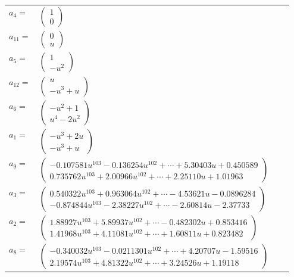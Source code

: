 \documentclass[1p]{elsarticle_modified}
\theoremstyle{definition}
\begin{document}
\begin{tabular}{m{7pt} m{180pt} m{7pt} m{180pt} }
\flushright $a_{4}=$&$\begin{pmatrix}1\\0\end{pmatrix}$ \\
\flushright $a_{11}=$&$\begin{pmatrix}0\\u\end{pmatrix}$ \\
\flushright $a_{5}=$&$\begin{pmatrix}1\\- u^2\end{pmatrix}$ \\
\flushright $a_{12}=$&$\begin{pmatrix}u\\- u^3+u\end{pmatrix}$ \\
\flushright $a_{6}=$&$\begin{pmatrix}- u^2+1\\u^4-2 u^2\end{pmatrix}$ \\
\flushright $a_{1}=$&$\begin{pmatrix}- u^3+2 u\\- u^3+u\end{pmatrix}$ \\
\flushright $a_{9}=$&$\begin{pmatrix}-0.107581 u^{103}-0.136254 u^{102}+\cdots+5.30403 u+0.450589\\0.735762 u^{103}+2.00966 u^{102}+\cdots+2.25110 u+1.01963\end{pmatrix}$ \\
\flushright $a_{3}=$&$\begin{pmatrix}0.540322 u^{103}+0.963064 u^{102}+\cdots-4.53621 u-0.0896284\\-0.874844 u^{103}-2.38227 u^{102}+\cdots-2.60814 u-2.37733\end{pmatrix}$ \\
\flushright $a_{2}=$&$\begin{pmatrix}1.88927 u^{103}+5.89937 u^{102}+\cdots-0.482302 u+0.853416\\1.41968 u^{103}+4.11081 u^{102}+\cdots+1.60811 u+0.823482\end{pmatrix}$ \\
\flushright $a_{8}=$&$\begin{pmatrix}-0.340032 u^{103}-0.0211301 u^{102}+\cdots+4.20707 u-1.59516\\2.19574 u^{103}+4.81322 u^{102}+\cdots+3.24526 u+1.19118\end{pmatrix}$ \\

\end{tabular}
\end{document}
